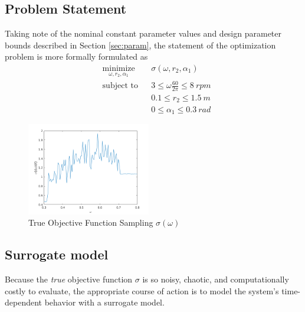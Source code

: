 \documentclass{article}
\begin{document}
\subsection{Problem Statement}
Taking note of the nominal constant parameter values and design parameter bounds described in Section \ref{sec:param}, the statement of the optimization problem is more formally formulated as
\begin{equation}
\begin{aligned}
& \underset{\omega, r_2, \alpha_1}{\text{minimize}} 
& & \sigma\left(\omega,r_2,\alpha_1\right) \\
& \text{subject to}
& & 3 \leq \omega\frac{60}{2\pi} \leq 8 ~ rpm \\
& & & 0.1 \leq r_2 \leq 1.5 ~m\\
& & & 0 \leq \alpha_1 \leq 0.3 ~ rad
\end{aligned}
\end{equation}

\begin{figure}
    \centering
    \includegraphics[width=0.48\textwidth]{Pics/stddphi.png}
    \caption{True Objective Function Sampling $\sigma(\omega)$}
    \label{fig:noise}
\end{figure}

\subsection{Surrogate model}
Because the \textit{true} objective function $\sigma$ is so noisy, chaotic, and computationally costly to evaluate, the appropriate course of action is to model the system's time-dependent behavior with a surrogate model.
\end{document}
